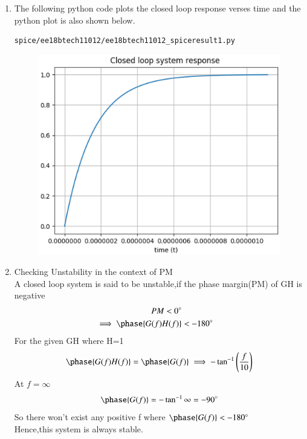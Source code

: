 \begin{enumerate}[label=\thesubsection.\arabic*.,ref=\thesubsection.\theenumi]
\begin{figure}[!h]
\caption{}
\label{fig:ee18btech11012_spiceresult}
\end{figure}
\item The following python code plots the closed loop response verses time and the python plot is also shown below.
\begin{lstlisting}
spice/ee18btech11012/ee18btech11012_spiceresult1.py
\end{lstlisting}
\begin{figure}[!h]
\centering
\includegraphics[width=\columnwidth]{./figs/ee18btech11012_1/ee18btech11012_spiceresult1.eps}
\caption{}
\label{fig:ee18btech11012_spiceresult1}
\end{figure}
\item Checking Unstability in the context of PM \\
\solution A closed loop system is said to be unstable,if the phase margin(PM) of GH is negative\\
\begin{align}
PM < 0\degree\\
\implies \phase{G(f)H(f)} &< -180\degree
\end{align}
For the given GH where H=1
\begin{align}
\phase{G(f)H(f)} = \phase{G(f)} \implies -\tan^{-1}\brak{\frac{f}{10}} 
\end{align}
At $f = \infty$
\begin{align}
\phase{G(f)} =-\tan^{-1}{\infty}= -90\degree
\end{align}
So there won't exist any positive f where $\phase{G(f)} < -180\degree$\\
Hence,this system is always stable.

\end{enumerate}
